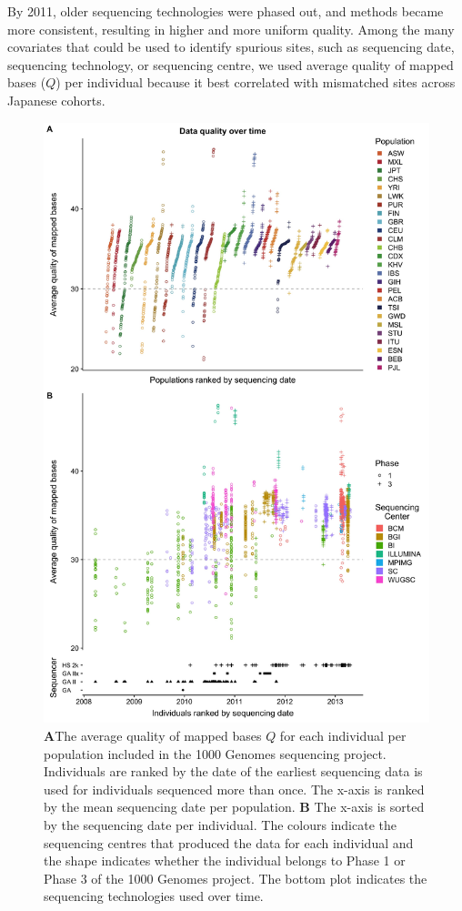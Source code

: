 \documentclass[9pt,lineno]{elife}
\begin{document}
By 2011, older sequencing technologies were phased out, and methods became more consistent, resulting in higher and more uniform quality.
Among the many covariates that could be used to identify spurious sites, such as sequencing date, sequencing technology, or sequencing centre, we used average quality of mapped bases ($Q$) per individual because it best correlated with mismatched sites across Japanese cohorts.



\begin{figure}
\includegraphics[width=0.95\hsize,keepaspectratio]{./Figures/MapQualOverTime.jpg}

\caption{\textbf{A}The average quality of mapped bases $Q$ for each individual per population included in the 1000 Genomes sequencing project. Individuals are ranked by the date of the earliest sequencing data is used for individuals sequenced more than once. The x-axis is ranked by the mean sequencing date per population. \textbf{B} The x-axis is sorted by the sequencing date per individual. The colours indicate the sequencing centres that produced the data for each individual and the shape indicates whether the individual belongs to Phase 1 or Phase 3 of the 1000 Genomes project. The bottom plot indicates the sequencing technologies used over time.}
\label{MapQual}
\end{figure}
\end{document}

